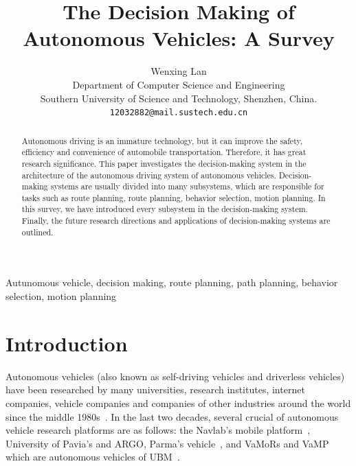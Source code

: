 \documentclass[conference]{IEEEtran}
\begin{document}
\title{The Decision Making of Autonomous Vehicles: A Survey}

\author{Wenxing Lan\\
Department of Computer Science and Engineering\\
Southern University of Science and Technology, Shenzhen, China.\\
{\tt\small 12032882@mail.sustech.edu.cn}

}

\maketitle


\begin{abstract}
	Autonomous driving is an immature technology, but it can improve the safety, efficiency and convenience of automobile transportation. Therefore, it has great research significance. This paper investigates the decision-making system in the architecture of the autonomous driving system of autonomous vehicles. Decision-making systems are usually divided into many subsystems, which are responsible for tasks such as route planning, route planning, behavior selection, motion planning. In this survey, we have introduced every subsystem in the decision-making system. Finally, the future research directions and applications of decision-making systems are outlined.
\end{abstract}

\begin{IEEEkeywords}
	Autunomous vehicle, decision making, route planning, path planning, behavior selection, motion planning
\end{IEEEkeywords}

\section{Introduction}
Autonomous vehicles (also known as self-driving vehicles and driverless vehicles) have been researched by many universities, research institutes, internet companies, vehicle companies and companies of other industries around the world since the middle 1980s~\cite{self_driving}. In the last two decades, several crucial of autonomous vehicle research platforms are as follows: the Navlab's mobile platform~\cite{Thorpe199144}, University of Pavia's and ARGO, Parma's vehicle~\cite{Broggi199955}, and VaMoRs and VaMP which are autonomous vehicles of UBM~\cite{Gregor200248}.
\end{document}
